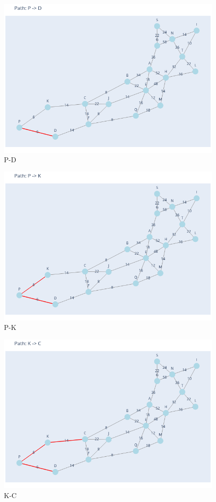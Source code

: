 \documentclass[11pt]{book}
\renewcommand{\=}[1]{\stackrel{#1}{=}} %
\theoremstyle{definition}
\theoremstyle{remark}
\begin{document}
\begin{figure}
    \centering
    \includegraphics[width=0.7\linewidth]{MSTpath/1.png}
    \caption{P-D}
    \label{fig:enter-label}
\end{figure}
\begin{figure}
    \centering
    \includegraphics[width=0.7\linewidth]{MSTpath/2.png}
    \caption{P-K}
    \label{fig:enter-label}
\end{figure}
\begin{figure}
    \centering
    \includegraphics[width=0.7\linewidth]{MSTpath/3.png}
    \caption{K-C}
    \label{fig:enter-label}
\end{figure}
\end{document}
